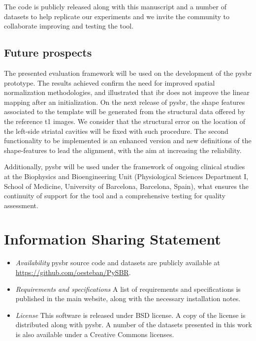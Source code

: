 \documentclass{frontiers}
\newcommand{\cbstart}{\relax}
\newcommand{\cbend}{\relax}
\newcommand{\emitem}[1]{\item \emph{#1}}
\begin{document}
The code is publicly released along with this manuscript and
  a number of datasets to help replicate our experiments and we
  invite the community to collaborate improving and testing
  the tool.
\cbstart
\subsection{Future prospects}
The presented evaluation framework will be used on the development
  of the \gls*{pysbr} prototype.
The results achieved confirm the need for improved spatial normalization
  methodologies, and illustrated that \gls*{ibr} does not improve the
  linear mapping after an initialization.
On the next release of \gls*{pysbr}, the shape features associated to the
  template will be generated from the structural data offered by the 
  reference \gls*{t1} images.
We consider that the structural error on the location of the left-side striatal
  cavities will be fixed with such procedure.
The second functionality to be implemented is an enhanced version and 
  new definitions of the shape-features to lead the alignment,
  with the aim at increasing the reliability.

Additionally, \gls*{pysbr} will be used under the framework of
  ongoing clinical studies at the Biophysics 
  and Bioengineering Unit (Physiological 
  Sciences Department I, School of Medicine, University of 
  Barcelona, Barcelona, Spain), what ensures the
  continuity of support for the tool and a comprehensive
  testing for quality assessment.
\cbend

\section*{Information Sharing Statement}
\label{sec:iss}

\begin{itemize}
\emitem{Availability} \gls*{pysbr} source code and datasets are
  publicly available at \url{https://github.com/oesteban/PySBR}.

\emitem{Requirements and specifications} A list of requirements and
  specifications is published in the main website, along with
  the necessary installation notes.

\emitem{License} This software is released under BSD license.
  A copy of the license is distributed along with \gls*{pysbr}.
  A number of the datasets presented in this work is also
  available under a Creative Commons licenses.
\end{itemize}
\end{document}
